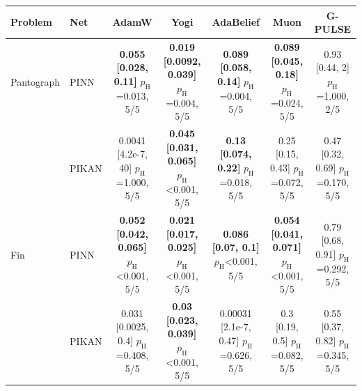 \begin{tabular}{llccccc}
\toprule
Problem & Net & AdamW & Yogi & AdaBelief & Muon & G-PULSE\\
\midrule
Pantograph & PINN & \makecell{\textbf{0.055 [0.028, 0.11]}\\{\scriptsize $p_{\mathrm{H}}$=0.013, 5/5}} & \makecell{\textbf{0.019 [0.0092, 0.039]}\\{\scriptsize $p_{\mathrm{H}}$=0.004, 5/5}} & \makecell{\textbf{0.089 [0.058, 0.14]}\\{\scriptsize $p_{\mathrm{H}}$=0.004, 5/5}} & \makecell{\textbf{0.089 [0.045, 0.18]}\\{\scriptsize $p_{\mathrm{H}}$=0.024, 5/5}} & \makecell{0.93 [0.44, 2]\\{\scriptsize $p_{\mathrm{H}}$=1.000, 2/5}}\\
 & PIKAN & \makecell{0.0041 [4.2e-7, 40]\\{\scriptsize $p_{\mathrm{H}}$=1.000, 5/5}} & \makecell{\textbf{0.045 [0.031, 0.065]}\\{\scriptsize $p_{\mathrm{H}}$<0.001, 5/5}} & \makecell{\textbf{0.13 [0.074, 0.22]}\\{\scriptsize $p_{\mathrm{H}}$=0.018, 5/5}} & \makecell{0.25 [0.15, 0.43]\\{\scriptsize $p_{\mathrm{H}}$=0.072, 5/5}} & \makecell{0.47 [0.32, 0.69]\\{\scriptsize $p_{\mathrm{H}}$=0.170, 5/5}}\\
\addlinespace
Fin & PINN & \makecell{\textbf{0.052 [0.042, 0.065]}\\{\scriptsize $p_{\mathrm{H}}$<0.001, 5/5}} & \makecell{\textbf{0.021 [0.017, 0.025]}\\{\scriptsize $p_{\mathrm{H}}$<0.001, 5/5}} & \makecell{\textbf{0.086 [0.07, 0.1]}\\{\scriptsize $p_{\mathrm{H}}$<0.001, 5/5}} & \makecell{\textbf{0.054 [0.041, 0.071]}\\{\scriptsize $p_{\mathrm{H}}$<0.001, 5/5}} & \makecell{0.79 [0.68, 0.91]\\{\scriptsize $p_{\mathrm{H}}$=0.292, 5/5}}\\
 & PIKAN & \makecell{0.031 [0.0025, 0.4]\\{\scriptsize $p_{\mathrm{H}}$=0.408, 5/5}} & \makecell{\textbf{0.03 [0.023, 0.039]}\\{\scriptsize $p_{\mathrm{H}}$<0.001, 5/5}} & \makecell{0.00031 [2.1e-7, 0.47]\\{\scriptsize $p_{\mathrm{H}}$=0.626, 5/5}} & \makecell{0.3 [0.19, 0.5]\\{\scriptsize $p_{\mathrm{H}}$=0.082, 5/5}} & \makecell{0.55 [0.37, 0.82]\\{\scriptsize $p_{\mathrm{H}}$=0.345, 5/5}}\\

\end{tabular}
